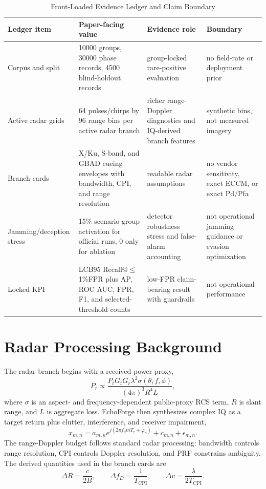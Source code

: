 \documentclass[10pt,journal]{IEEEtran}
\makeatletter
\newcommand{\PrimaryKPI}{LCB95 Recall@$\leq$1\%FPR}
\newcommand{\MetricScenarioGroups}{10000}
\newcommand{\MetricPhaseRecords}{30000}
\newcommand{\MetricHoldoutRecords}{4500}
\makeatother
\begin{document}
\begin{table}[t]
  \caption{Front-Loaded Evidence Ledger and Claim Boundary}
  \label{tab:frontledger}
  \centering
  \small
  \begin{tabularx}{\textwidth}{@{}p{}YYp{0.24\textwidth}@{}}
    \toprule
    Ledger item & Paper-facing value & Evidence role & Boundary \\
    \midrule
    Corpus and split & \MetricScenarioGroups{} groups, \MetricPhaseRecords{} phase records, \MetricHoldoutRecords{} blind-holdout records & group-locked rare-positive evaluation & no field-rate or deployment prior \\
    Active radar grids & 64 pulses/chirps by 96 range bins per active radar branch & richer range-Doppler diagnostics and IQ-derived branch features & synthetic bins, not measured imagery \\
    Branch cards & X/Ku, S-band, and GBAD cueing envelopes with bandwidth, CPI, and range resolution & readable radar assumptions & no vendor sensitivity, exact ECCM, or exact Pd/Pfa \\
    Jamming/deception stress & 15\% scenario-group activation for official runs, 0 only for ablation & detector robustness stress and false-alarm accounting & not operational jamming guidance or evasion optimization \\
    Locked KPI & \PrimaryKPI{} plus AP, ROC AUC, FPR, F1, and selected-threshold counts & low-FPR claim-bearing result with guardrails & not operational performance \\
    \bottomrule
  \end{tabularx}
\end{table}

\section{Radar Processing Background}
The radar branch begins with a received-power proxy,
\begin{equation}
P_r \propto \frac{P_tG_tG_r\lambda^2\sigma(\theta,f,\phi)}{(4\pi)^3R^4L},
\end{equation}
where $\sigma$ is an aspect- and frequency-dependent public-proxy RCS term, $R$ is slant range, and $L$ is aggregate loss. EchoForge then synthesizes complex IQ as a target return plus clutter, interference, and receiver impairment,
\begin{equation}
x_{m,n}=a_{m,n}e^{j(2\pi f_dmT_r+\varphi_n)}+c_{m,n}+\epsilon_{m,n}.
\end{equation}
The range-Doppler budget follows standard radar processing: bandwidth controls range resolution, CPI controls Doppler resolution, and PRF constrains ambiguity. The derived quantities used in the branch cards are
\begin{equation}
\Delta R=\frac{c}{2B},\qquad \Delta f_D=\frac{1}{T_{\mathrm{CPI}}},\qquad \Delta v=\frac{\lambda}{2T_{\mathrm{CPI}}}.
\end{equation}
\end{document}
